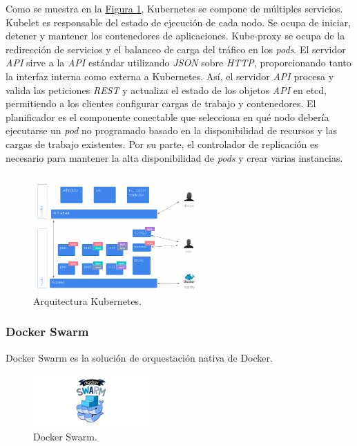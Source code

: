 Como se muestra en la \hyperref[fig:kubernetesarchitecture]{Figura \ref{fig:kubernetesarchitecture}}, Kubernetes se compone de múltiples servicios. Kubelet es responsable del estado de ejecución de cada nodo. Se ocupa de iniciar, detener y mantener los contenedores de aplicaciones. Kube-proxy se ocupa de la redirección de servicios y el balanceo de carga del tráfico en los \textit{pods}. El servidor \textit{API} sirve a la \textit{API} estándar utilizando \textit{JSON} sobre \textit{HTTP}, proporcionando tanto la interfaz interna como externa a Kubernetes. Así, el servidor \textit{API} procesa y valida las peticiones \textit{REST} y actualiza el estado de los objetos \textit{API} en etcd, permitiendo a los clientes configurar cargas de trabajo y contenedores. El planificador es el componente conectable que selecciona en qué nodo debería ejecutarse un \textit{pod} no programado basado en la disponibilidad de recursos y las cargas de trabajo existentes. Por su parte, el controlador de replicación es necesario para mantener la alta disponibilidad de \textit{pods} y crear varias instancias. 

\begin{figure}[H]
\centering
\includegraphics[width=0.6\textwidth]{images/figures/kubernetesarchitecture.png}
\caption{Arquitectura Kubernetes.\footnotemark \label{fig:kubernetesarchitecture}}
\end{figure}


\subsubsection{Docker Swarm}

Docker Swarm es la solución de orquestación nativa de Docker.

\begin{figure}[H]
\centering
\includegraphics[width=0.4\textwidth]{images/figures/swarm.png}
\caption{Docker Swarm.\footnotemark}
\end{figure}

